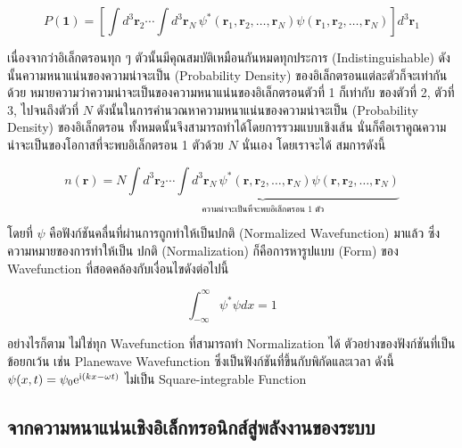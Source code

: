 \begin{equation}\label{eq:elec_prob_density_1e}
    P(\bm{1}) = \left [ \int {d}^{3} \bm{r}_{2} \cdots \int {d}^{3} \bm{r}_{N} \,
        \psi^*(\bm{r}_{1}, \bm{r}_{2}, \dots, \bm{r}_{N}) \psi(\bm{r}_{1}, \bm{r}_2,
        \dots, \bm{r}_N) \right ] {d}^{3} \bm{r}_{1}
\end{equation}

เนื่องจากว่าอิเล็กตรอนทุก ๆ ตัวนั้นมีคุณสมบัติเหมือนกันหมดทุกประการ (Indistinguishable) ดังนั้นความหนาแน่นของความน่าจะเป็น
(Probability Density) ของอิเล็กตรอนแต่ละตัวก็จะเท่ากันด้วย หมายความว่าความน่าจะเป็นของความหนาแน่นของอิเล็กตรอนตัวที่ 1 ก็เท่ากับ%
ของตัวที่ 2, ตัวที่ 3, ไปจนถึงตัวที่ $N$ ดังนั้นในการคำนวณหาความหนาแน่นของความน่าจะเป็น (Probability Density) ของอิเล็กตรอน%
ทั้งหมดนั้นจึงสามารถทำได้โดยการรวมแบบเชิงเส้น นั่นก็คือเราคูณความน่าจะเป็นของโอกาสที่จะพบอิเล็กตรอน 1 ตัวด้วย $N$ นั่นเอง โดยเราจะได้%
สมการดังนี้

\begin{equation}\label{eq:elec_density_all}
    n(\bm{r}) = N \underbrace{\int {d}^{3} \bm{r}_{2} \cdots \int {d}^{3} \bm{r}_{N} \,
        \psi^*(\bm{r}, \bm{r}_{2}, \dots, \bm{r}_{N}) \psi(\bm{r}, \bm{r}_2,
        \dots, \bm{r}_N)}_{\textstyle \text{ความน่าจะเป็นที่จะพบอิเล็กตรอน 1 ตัว}}
\end{equation}

\noindent โดยที่ $\psi$ คือฟังก์ชันคลื่นที่ผ่านการถูกทำให้เป็นปกติ (Normalized Wavefunction) มาแล้ว ซึ่งความหมายของการทำให้เป็น%
ปกติ (Normalization) ก็คือการหารูปแบบ (Form) ของ Wavefunction ที่สอดคล้องกับเงื่อนไขดังต่อไปนี้

\begin{equation}\label{eq:square_integrable}
    \int^\infty_{-\infty} \psi^* \psi dx = 1
\end{equation}

อย่างไรก็ตาม ไม่ใช่ทุก Wavefunction ที่สามารถทำ Normalization ได้ ตัวอย่างของฟังก์ชันที่เป็นข้อยกเว้น เช่น Planewave Wavefunction
ซึ่งเป็นฟังก์ชันที่ขึ้นกับพิกัดและเวลา ดังนี้ $\psi(x,t) = \psi_0 {\rm e}^{ {\rm i} (k x-\omega t)}$ ไม่เป็น Square-integrable
Function

\subsection{จากความหนาแน่นเชิงอิเล็กทรอนิกส์สู่พลังงานของระบบ}
\label{ssec:ener_density}

